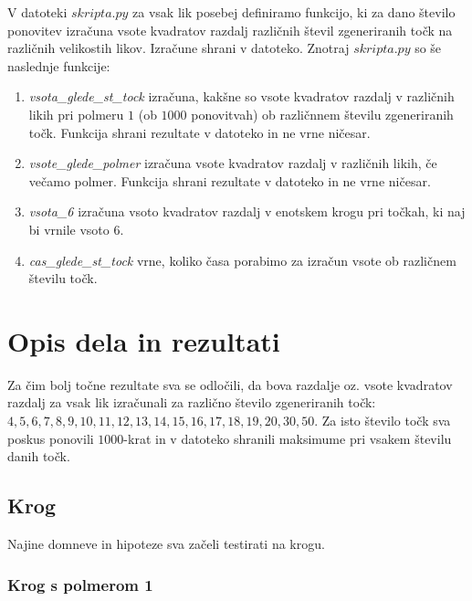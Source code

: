 \documentclass[a4paper]{report}
\begin{document}
V datoteki \colorbox{gray!10}{$skripta.py$} za vsak lik posebej definiramo funkcijo, ki za dano število ponovitev izračuna vsote kvadratov razdalj različnih števil zgeneriranih točk na različnih velikostih likov. Izračune shrani v datoteko.
Znotraj \colorbox{gray!10}{$skripta.py$} so še naslednje funkcije:
\begin{enumerate}
\item \textit{vsota\_glede\_st\_tock} izračuna, kakšne so vsote kvadratov razdalj v različnih likih pri polmeru $1$ (ob $1000$ ponovitvah) ob različnnem številu zgeneriranih točk. Funkcija shrani rezultate v datoteko in ne vrne ničesar.
\item \textit{vsote\_glede\_polmer} izračuna vsote kvadratov razdalj v različnih likih, če večamo polmer. Funkcija shrani rezultate v datoteko in ne vrne ničesar.
\item \textit{vsota\_6} izračuna vsoto kvadratov razdalj v enotskem krogu pri točkah, ki naj bi vrnile vsoto $6$.
\item \textit{cas\_glede\_st\_tock} vrne, koliko časa porabimo za izračun vsote ob različnem številu točk.
\end{enumerate}



\section{Opis dela in rezultati}

Za čim bolj točne rezultate sva se odločili, da bova razdalje oz. vsote kvadratov razdalj za vsak lik izračunali za različno število zgeneriranih točk: $4, 5, 6, 7, 8, 9, 10, 11, 12, 13, 14, 15, 16, 17, 18, 19, 20, 30, 50$. Za isto število točk sva poskus ponovili $1000$-krat in v datoteko shranili maksimume pri vsakem številu danih točk.

\subsection{Krog}

Najine domneve in hipoteze sva začeli testirati na krogu.

\subsubsection{Krog s polmerom 1}
\end{document}
